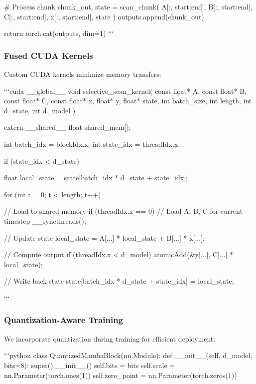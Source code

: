 \documentclass[10pt,journal,compsoc]{IEEEtran}
\begin{document}
        # Process chunk
        chunk_out, state = scan_chunk(
            A[:, start:end], 
            B[:, start:end],
            C[:, start:end], 
            x[:, start:end],
            state
        )
        outputs.append(chunk_out)
    
    return torch.cat(outputs, dim=1)
```

\subsubsection{Fused CUDA Kernels}

Custom CUDA kernels minimize memory transfers:

```cuda
__global__ void selective_scan_kernel(
    const float* A, const float* B, const float* C, const float* x,
    float* y, float* state,
    int batch_size, int length, int d_state, int d_model
) {
    extern __shared__ float shared_mem[];
    
    int batch_idx = blockIdx.x;
    int state_idx = threadIdx.x;
    
    if (state_idx < d_state) {
        float local_state = state[batch_idx * d_state + state_idx];
        
        for (int t = 0; t < length; t++) {
            // Load to shared memory
            if (threadIdx.x == 0) {
                // Load A, B, C for current timestep
            }
            __syncthreads();
            
            // Update state
            local_state = A[...] * local_state + B[...] * x[...];
            
            // Compute output
            if (threadIdx.x < d_model) {
                atomicAdd(&y[...], C[...] * local_state);
            }
        }
        
        // Write back state
        state[batch_idx * d_state + state_idx] = local_state;
    }
}
```

\subsubsection{Quantization-Aware Training}

We incorporate quantization during training for efficient deployment:

```python
class QuantizedMambaBlock(nn.Module):
    def __init__(self, d_model, bits=8):
        super().__init__()
        self.bits = bits
        self.scale = nn.Parameter(torch.ones(1))
        self.zero_point = nn.Parameter(torch.zeros(1))
        
\end{document}
